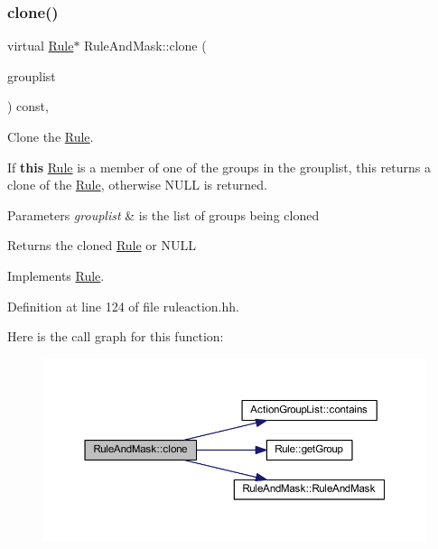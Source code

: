 \subsubsection{\texorpdfstring{clone()}{clone()}}
{\footnotesize\ttfamily virtual \mbox{\hyperlink{class_rule}{Rule}}$\ast$ Rule\+And\+Mask\+::clone (\begin{DoxyParamCaption}\item[{const \mbox{\hyperlink{class_action_group_list}{Action\+Group\+List}} \&}]{grouplist }\end{DoxyParamCaption}) const\hspace{0.3cm}{\ttfamily [inline]}, {\ttfamily [virtual]}}



Clone the \mbox{\hyperlink{class_rule}{Rule}}. 

If {\bfseries{this}} \mbox{\hyperlink{class_rule}{Rule}} is a member of one of the groups in the grouplist, this returns a clone of the \mbox{\hyperlink{class_rule}{Rule}}, otherwise N\+U\+LL is returned. 
\begin{DoxyParams}{Parameters}
{\em grouplist} & is the list of groups being cloned \\
\hline
\end{DoxyParams}
\begin{DoxyReturn}{Returns}
the cloned \mbox{\hyperlink{class_rule}{Rule}} or N\+U\+LL 
\end{DoxyReturn}


Implements \mbox{\hyperlink{class_rule_a70de90a76461bfa7ea0b575ce3c11e4d}{Rule}}.



Definition at line 124 of file ruleaction.\+hh.

Here is the call graph for this function\+:
\nopagebreak
\begin{figure}[H]
\begin{center}
\leavevmode
\includegraphics[width=350pt]{class_rule_and_mask_a0d8910f37dde4f7ee748e529f174f332_cgraph}
\end{center}
\end{figure}
\mbox{\label{class_rule_and_mask_a787f3bb11488a68584a55ef1fe378be7}} 
